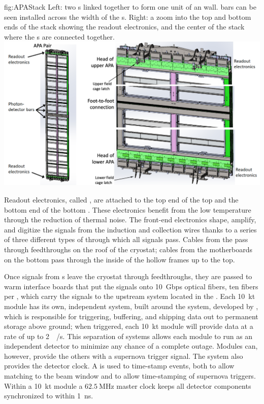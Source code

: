 \begin{dunefigure}{fig:APAStack}
{Left: two s linked together to form one unit of an  wall.  bars can be seen installed across the width of the s. Right: a zoom into the top and bottom ends of the  stack showing the readout electronics, and the center of the stack where the s are connected together.}
\includegraphics[width=.8\textwidth]{graphics/APAStack.png}
\end{dunefigure}

Readout electronics, called , are attached to the top end of the top  and the bottom end of the bottom . These  electronics benefit from the low  temperature through the reduction of thermal noise. The front-end electronics shape, amplify, and digitize the signals from the induction and collection wires thanks to a series of three different types of  through which all signals pass.
Cables from the  pass through feedthroughs on the roof of the cryostat; cables from the motherboards on the bottom  pass through the inside of the hollow  frames up to the top.

Once signals from s leave the cryostat through feedthroughs, they are passed to warm interface boards that put the signals onto \SI{10}{Gbps} optical fibers, ten fibers per , which carry the signals to the upstream  system located in the . Each \SI{10}{\kilo\tonne} module has its own, independent  system, built around the  system, developed by , which is responsible for triggering, buffering, and shipping data out to permanent storage above ground; when triggered, each \SI{10}{\kilo\tonne} module will provide data at a rate of up to \SI{2}{\tera\byte/\second}. This separation of  systems allows each module to run as an independent detector to minimize any chance of a complete  outage. Modules can, however, provide the others with a supernova trigger signal. The  system also provides the detector clock. A   is used to time-stamp events, both to allow matching to the beam window and to allow time-stamping of supernova triggers. Within a \SI{10}{\kilo\tonne} module a $\SI{62.5}{\mega\hertz}$ master clock keeps all detector components synchronized to within \SI{1}{\nano\second}.

